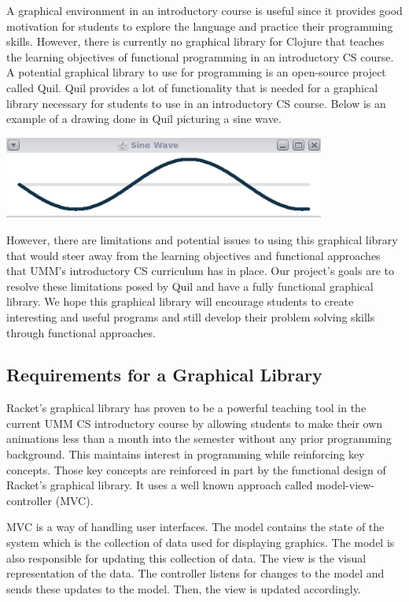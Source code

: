 \documentclass[12pt]{article}
\newcommand{\comment}[1]{}
\newcommand{\todo}[1]{\textcolor{blue}{\comment{To Do: {#1}}}}
\begin{document}
A graphical environment in an introductory course is useful since it provides good motivation for students to explore the language and practice their programming skills. However, there is currently no graphical library for Clojure that teaches the learning objectives of functional programming in an introductory CS course. A potential graphical library to use for programming is an open-source project called Quil. Quil provides a lot of functionality that is needed for a graphical library necessary for students to use in an introductory CS course. Below is an example of a drawing done in Quil picturing a sine wave.

\begin{center}
\includegraphics[width=300pt]{sine-wave}
\end{center}

However, there are limitations and potential issues to using this graphical library that would steer away from the learning objectives and functional approaches that UMM's introductory CS curriculum has in place. Our project's goals are to resolve these limitations posed by Quil and have a fully functional graphical library. We hope this graphical library will encourage students to create interesting and useful programs and still develop their problem solving skills through functional approaches.


\subsection{Requirements for a Graphical Library}\label{subsec:requirements}
Racket's graphical library has proven to be a powerful teaching tool in the current UMM CS introductory course by allowing students to make their own animations less than a month into the semester without any prior programming background. This maintains interest in programming while reinforcing key concepts. Those key concepts are reinforced in part by the functional design of Racket's graphical library. It uses a well known approach called model-view-controller (MVC).

MVC is a way of handling user interfaces. The model contains the state of the system which is the collection of data used for displaying graphics. The model is also responsible for updating this collection of data. The view is the visual representation of the data. %
The controller listens for changes to the model and sends these updates to the model. Then, the view is updated accordingly.
\end{document}
